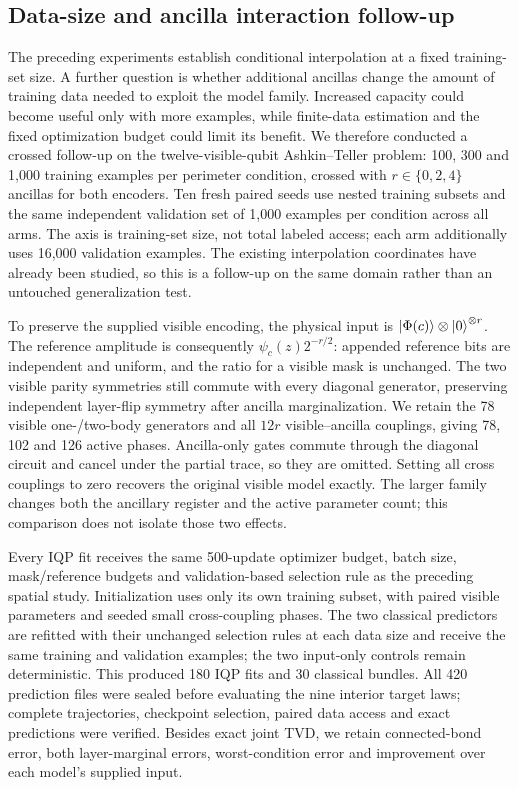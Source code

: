 \documentclass[pra,aps,10pt,twocolumn,floatfix,superscriptaddress,
notitlepage,longbibliography]{revtex4-2}
\begin{document}
\subsection{Data-size and ancilla interaction follow-up}
\label{sec:data-ancilla-followup}

The preceding experiments establish conditional interpolation at a fixed training-set size. A further question is whether additional ancillas change the amount of training data needed to exploit the model family. Increased capacity could become useful only with more examples, while finite-data estimation and the fixed optimization budget could limit its benefit. We therefore conducted a crossed follow-up on the twelve-visible-qubit Ashkin--Teller problem: 100, 300 and 1,000 training examples per perimeter condition, crossed with $r\in\{0,2,4\}$ ancillas for both encoders. Ten fresh paired seeds use nested training subsets and the same independent validation set of 1,000 examples per condition across all arms. The axis is training-set size, not total labeled access; each arm additionally uses 16,000 validation examples. The existing interpolation coordinates have already been studied, so this is a follow-up on the same domain rather than an untouched generalization test.

To preserve the supplied visible encoding, the physical input is $\ket{\Phi(c)}\otimes\ket{0}^{\otimes r}$. The reference amplitude is consequently $\psi_c(z)2^{-r/2}$: appended reference bits are independent and uniform, and the ratio for a visible mask is unchanged. The two visible parity symmetries still commute with every diagonal generator, preserving independent layer-flip symmetry after ancilla marginalization. We retain the 78 visible one-/two-body generators and all $12r$ visible--ancilla couplings, giving 78, 102 and 126 active phases. Ancilla-only gates commute through the diagonal circuit and cancel under the partial trace, so they are omitted. Setting all cross couplings to zero recovers the original visible model exactly. The larger family changes both the ancillary register and the active parameter count; this comparison does not isolate those two effects.

Every IQP fit receives the same 500-update optimizer budget, batch size, mask/reference budgets and validation-based selection rule as the preceding spatial study. Initialization uses only its own training subset, with paired visible parameters and seeded small cross-coupling phases. The two classical predictors are refitted with their unchanged selection rules at each data size and receive the same training and validation examples; the two input-only controls remain deterministic. This produced 180 IQP fits and 30 classical bundles. All 420 prediction files were sealed before evaluating the nine interior target laws; complete trajectories, checkpoint selection, paired data access and exact predictions were verified. Besides exact joint TVD, we retain connected-bond error, both layer-marginal errors, worst-condition error and improvement over each model's supplied input.
\end{document}
